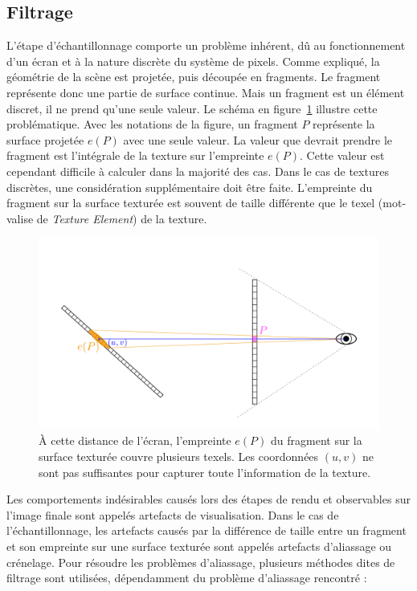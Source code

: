 \subsection{Filtrage}
\label{subsec:filtering}

L'étape d'échantillonnage comporte un problème inhérent, dû au fonctionnement d'un écran et à la nature discrète du système de pixels. Comme expliqué, la géométrie de la scène est projetée, puis découpée en fragments. Le fragment représente donc une partie de surface continue. Mais un fragment est un élément discret, il ne prend qu'une seule valeur. Le schéma en figure~\ref{fig:aliasing} illustre cette problématique. Avec les notations de la figure, un fragment $P$ représente la surface projetée $e(P)$ avec une seule valeur. La valeur que devrait prendre le fragment est l'intégrale de la texture sur l'empreinte $e(P)$. Cette valeur est cependant difficile à calculer dans la majorité des cas. Dans le cas de textures discrètes, une considération supplémentaire doit être faite. L'empreinte du fragment sur la surface texturée est souvent de taille différente que le texel (mot-valise de \textit{Texture Element}) de la texture.

\bigskip

\begin{figure}
    \centering
    \includegraphics[width=\textwidth]{contenu/resources/images/schema_filtrage}
    \caption[Visualisation du problème d'échantillonnage lors du rendu par tramage]{À cette distance de l'écran, l'empreinte $e(P)$ du fragment sur la surface texturée couvre plusieurs texels. Les coordonnées $(u, v)$ ne sont pas suffisantes pour capturer toute l'information de la texture.}
    \label{fig:aliasing}
\end{figure}

Les comportements indésirables causés lors des étapes de rendu et observables sur l'image finale sont appelés artefacts de visualisation. Dans le cas de l'échantillonnage, les artefacts causés par la différence de taille entre un fragment et son empreinte sur une surface texturée sont appelés artefacts d'aliassage ou crénelage. Pour résoudre les problèmes d'aliassage, plusieurs méthodes dites de filtrage sont utilisées, dépendamment du problème d'aliassage rencontré :

